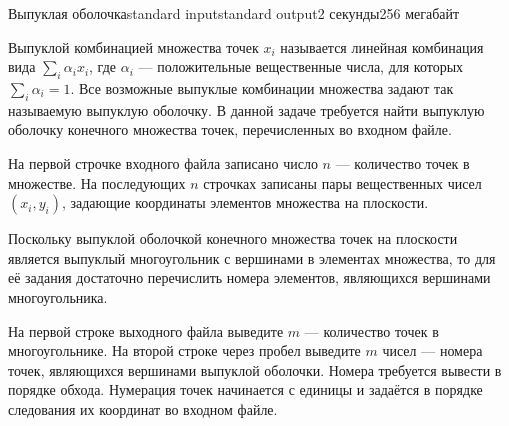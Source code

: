 \begin{problem}{Выпуклая оболочка}{standard input}{standard output}{2 секунды}{256 мегабайт}

Выпуклой комбинацией множества точек $x_i$ называется линейная комбинация вида $\sum_i \alpha_i x_i$, где $\alpha_i$ — положительные вещественные числа, для которых $\sum_i \alpha_i = 1$. Все возможные выпуклые комбинации множества задают так называемую выпуклую оболочку. В данной задаче требуется найти выпуклую оболочку конечного множества точек, перечисленных во входном файле.

\InputFile

На первой строчке входного файла записано число $n$ — количество точек в множестве. На последующих $n$ строчках записаны пары вещественных чисел $(x_i, y_i)$, задающие координаты элементов множества на плоскости.

\OutputFile

Поскольку выпуклой оболочкой конечного множества точек на плоскости является выпуклый многоугольник с вершинами в элементах множества, то для её задания достаточно перечислить номера элементов, являющихся вершинами многоугольника.

На первой строке выходного файла выведите $m$ — количество точек в многоугольнике. На второй строке через пробел выведите $m$ чисел — номера точек, являющихся вершинами выпуклой оболочки. Номера требуется вывести в порядке обхода. Нумерация точек начинается с единицы и задаётся в порядке следования их координат во входном файле.

\Examples

\begin{example}%
%
\end{example}

\end{problem}
